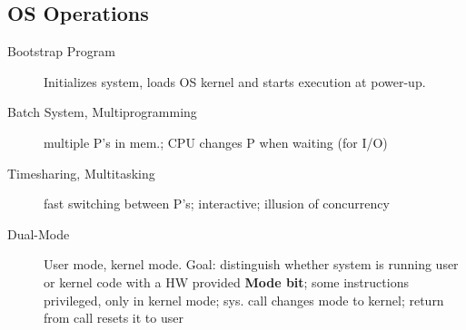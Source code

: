 \subsection*{OS Operations}
\begin{description}
  \item[Bootstrap Program] Initializes system, loads OS kernel and starts execution at power-up.
  \item[Batch System, Multiprogramming] multiple P's in mem.; CPU changes P when waiting (for I/O)
  \item[Timesharing, Multitasking]  fast switching between P's; interactive; illusion of concurrency
  \item[Dual-Mode] User mode, kernel mode. Goal: distinguish whether system is running user or kernel code with a HW provided \textbf{Mode bit}; some instructions
privileged, only in kernel mode; sys. call changes mode to kernel; return from call resets it to user
\end{description}
